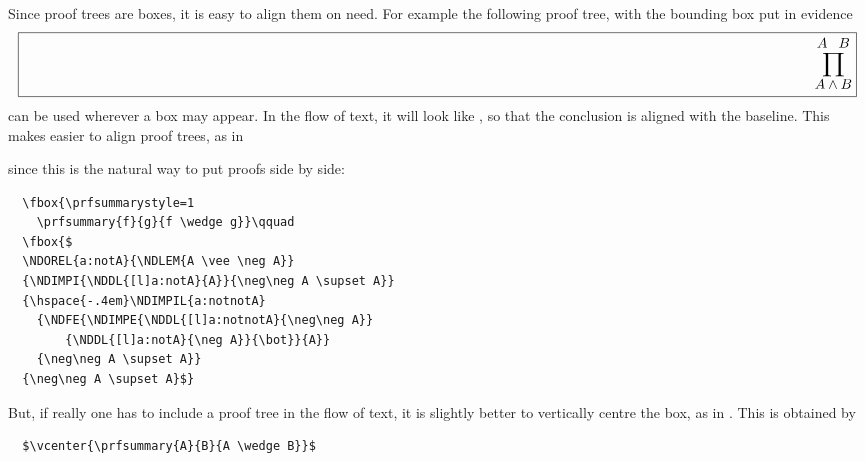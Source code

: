 \documentclass{amsart}
\begin{document}
Since proof trees are boxes, it is easy to align them on need. For
example the following proof tree, with the bounding box put in
evidence
\begin{displaymath}
  \fbox{\prfsummarystyle=1
    \prfsummary{A}{B}{A \wedge B}}
\end{displaymath}
can be used wherever a box may appear. In the flow of text, it will
look like , so
that the conclusion is aligned with the baseline. This makes easier to
align proof trees, as in
\begin{center}
  \qquad
\end{center}
since this is the natural way to put proofs side by side:
\begin{verbatim}
  \fbox{\prfsummarystyle=1
    \prfsummary{f}{g}{f \wedge g}}\qquad
  \fbox{$
  \NDOREL{a:notA}{\NDLEM{A \vee \neg A}}
  {\NDIMPI{\NDDL{[l]a:notA}{A}}{\neg\neg A \supset A}}
  {\hspace{-.4em}\NDIMPIL{a:notnotA}
    {\NDFE{\NDIMPE{\NDDL{[l]a:notnotA}{\neg\neg A}}
        {\NDDL{[l]a:notA}{\neg A}}{\bot}}{A}} 
    {\neg\neg A \supset A}}
  {\neg\neg A \supset A}$}
\end{verbatim}

But, if really one has to include a proof tree in the flow of text, it
is slightly better to vertically centre the box, as in
. This is obtained by
\begin{verbatim}
  $\vcenter{\prfsummary{A}{B}{A \wedge B}}$
\end{verbatim}
\end{document}
